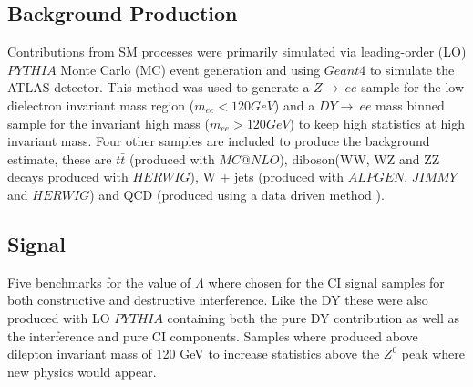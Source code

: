 \subsection{Background Production}
	Contributions from SM processes were primarily simulated via leading-order (LO) $PYTHIA$ \cite{pythia} Monte Carlo (MC) event generation and using $Geant 4$ \cite{geant} to simulate the ATLAS detector. This method was used to generate a $Z\rightarrow~ee$ sample for the low dielectron invariant mass region ($m_{ee} < 120 GeV$) and a $DY\rightarrow~ee$ mass binned sample for the invariant high mass ($m_{ee} > 120 GeV$) to keep high statistics at high invariant mass. Four other samples are included to produce the background estimate, these are $t\bar{t}$ (produced with $MC@NLO$), diboson(WW, WZ and ZZ decays produced with $HERWIG$), W + jets (produced with $ALPGEN$, $JIMMY$ and $HERWIG$) and QCD (produced using a data driven method \cite{QCD}).

\subsection{Signal} 

	Five benchmarks for the value of $\Lambda$ where chosen for the CI signal samples for both constructive and destructive interference. Like the DY these were also produced with LO $PYTHIA$ containing both the pure DY contribution as well as the interference and pure CI components. Samples where produced above dilepton invariant mass of 120 GeV to increase statistics above the $Z^{0}$ peak where new physics would appear. 

